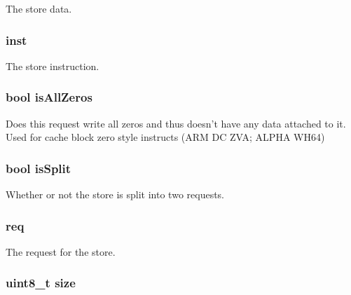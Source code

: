\label{structLSQUnit_1_1SQEntry_a4454a49c48ef08781793358f56b7bbc6}
The store data. \hypertarget{structLSQUnit_1_1SQEntry_af5d4fb974eeb4507d4c837d365d0cefc}{
\subsubsection[{inst}]{ {\bf inst}}}
\label{structLSQUnit_1_1SQEntry_af5d4fb974eeb4507d4c837d365d0cefc}
The store instruction. \hypertarget{structLSQUnit_1_1SQEntry_a10014e17609d3ee0e6018bcbba1f4e88}{
\subsubsection[{isAllZeros}]{\setlength{\rightskip}{0pt plus 5cm}bool {\bf isAllZeros}}}
\label{structLSQUnit_1_1SQEntry_a10014e17609d3ee0e6018bcbba1f4e88}
Does this request write all zeros and thus doesn't have any data attached to it. Used for cache block zero style instructs (ARM DC ZVA; ALPHA WH64) \hypertarget{structLSQUnit_1_1SQEntry_afd8e5886f3bd5827ade12fcaf8ea2a47}{
\subsubsection[{isSplit}]{\setlength{\rightskip}{0pt plus 5cm}bool {\bf isSplit}}}
\label{structLSQUnit_1_1SQEntry_afd8e5886f3bd5827ade12fcaf8ea2a47}
Whether or not the store is split into two requests. \hypertarget{structLSQUnit_1_1SQEntry_a956cd41d82347558b9c0a5b0474903f2}{
\subsubsection[{req}]{ {\bf req}}}
\label{structLSQUnit_1_1SQEntry_a956cd41d82347558b9c0a5b0474903f2}
The request for the store. \hypertarget{structLSQUnit_1_1SQEntry_ae5dc6ffcd9b7605c7787791e40cc6bb0}{
\subsubsection[{size}]{\setlength{\rightskip}{0pt plus 5cm}uint8\_\-t {\bf size}}}
